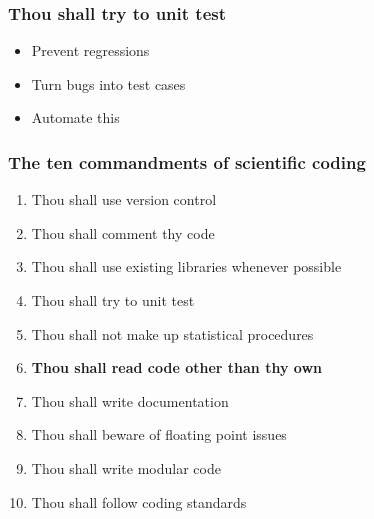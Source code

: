 \documentclass[slidestop]{beamer}
\begin{document}
\begin{frame}
  \frametitle{Thou shall try to unit test}
  \begin{itemize}[<+->]
    \item Prevent regressions
    \item Turn bugs into test cases
    \item Automate this
  \end{itemize}
\end{frame}

{
  \frame{}
}

\begin{frame}
  \frametitle{The ten commandments of scientific coding}
  \begin{enumerate}
    \item Thou shall use version control
    \item Thou shall comment thy code
    \item Thou shall use existing libraries whenever possible
    \item Thou shall try to unit test
    \item Thou shall not make up statistical procedures
    \item {\bf Thou shall read code other than thy own}
    \item Thou shall write documentation
    \item Thou shall beware of floating point issues
    \item Thou shall write modular code
    \item Thou shall follow coding standards
  \end{enumerate}
\end{frame}
\end{document}
